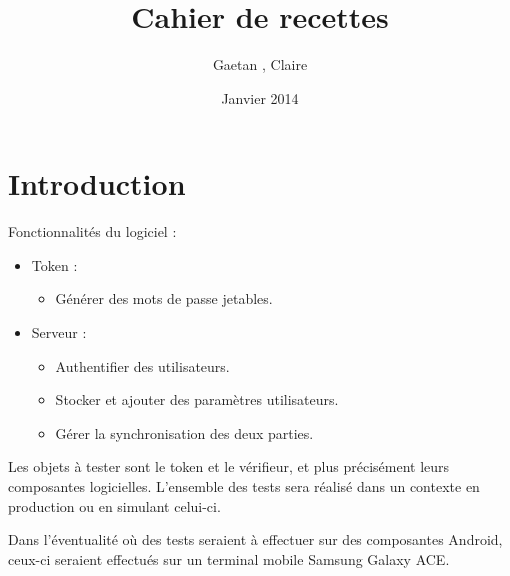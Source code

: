 \documentclass{"../../res/univ-projet"}
\title{Cahier de recettes}
\author{Gaetan \bsc{Ferry}, Claire \bsc{Hardouin}}
\date{Janvier 2014}
\begin{document}
  \maketitle
  \section{Introduction}
  Fonctionnalités du logiciel :
  \begin{itemize}
    \item Token : 
    \begin{itemize}
      \item Générer des mots de passe jetables.
    \end{itemize}

    \item Serveur :
    \begin{itemize}
      \item Authentifier des utilisateurs.
      \item Stocker et ajouter des paramètres utilisateurs.
      \item Gérer la synchronisation des deux parties.
    \end{itemize}
  \end{itemize}

  Les objets à tester sont le token et le vérifieur, et plus précisément leurs composantes logicielles. L'ensemble des tests sera réalisé dans un contexte \og{}en 
  production\fg{} ou en simulant celui-ci.
  
  Dans l'éventualité où des tests seraient à effectuer sur des composantes Android, ceux-ci seraient effectués sur un terminal mobile Samsung Galaxy ACE.
  
\end{document}

